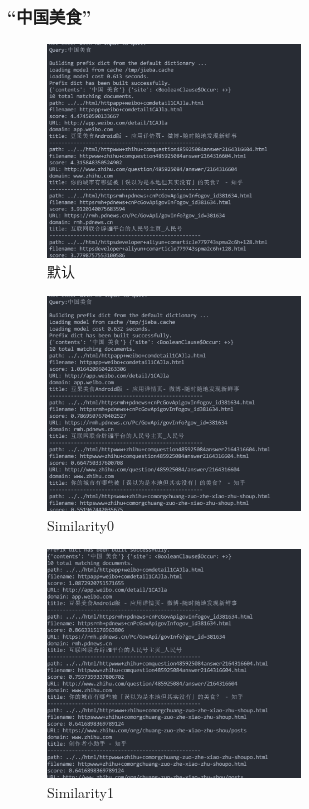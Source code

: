 \documentclass[12pt,a4paper]{article}
\begin{document}
\subsubsection{“中国美食”}

\begin{figure}[H]
	\includegraphics[width=0.6\textwidth]{3_-1.png}
	\centering
	 \caption{默认}
\end{figure}
\begin{figure}[H]
	\includegraphics[width=0.6\textwidth]{3_0.png}
	\centering
	 \caption{Similarity0}
\end{figure}
\begin{figure}[H]
	\includegraphics[width=0.6\textwidth]{3_1.png}
	\centering
	 \caption{Similarity1}
\end{figure}
\end{document}
